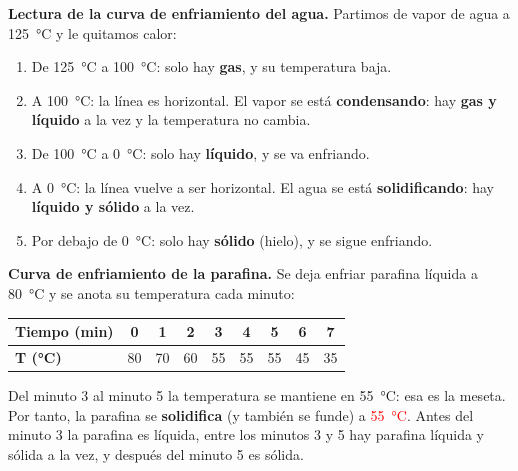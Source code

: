 \begin{example}
    \textbf{Lectura de la curva de enfriamiento del agua.} Partimos de vapor de agua a \qty{125}{\celsius} y le quitamos calor:
    \begin{enumerate}[label=\numberballmDarkTeal]
        \item De \qty{125}{\celsius} a \qty{100}{\celsius}: solo hay \textbf{gas}, y su temperatura baja.
        \item A \qty{100}{\celsius}: la línea es horizontal. El vapor se está \textbf{condensando}: hay \textbf{gas y líquido} a la vez y la temperatura no cambia.
        \item De \qty{100}{\celsius} a \qty{0}{\celsius}: solo hay \textbf{líquido}, y se va enfriando.
        \item A \qty{0}{\celsius}: la línea vuelve a ser horizontal. El agua se está \textbf{solidificando}: hay \textbf{líquido y sólido} a la vez.
        \item Por debajo de \qty{0}{\celsius}: solo hay \textbf{sólido} (hielo), y se sigue enfriando.
    \end{enumerate}
\end{example}

\begin{example}
    \textbf{Curva de enfriamiento de la parafina.} Se deja enfriar parafina líquida a \qty{80}{\celsius} y se anota su temperatura cada minuto:
    \begin{center}
        \renewcommand{\arraystretch}{1.3}
        \begin{tabular}{@{}lcccccccc@{}}
            \toprule
            \textbf{Tiempo (min)} & \textbf{0} & \textbf{1} & \textbf{2} & \textbf{3} & \textbf{4} & \textbf{5} & \textbf{6} & \textbf{7} \\
            \midrule
            \textbf{T (\unit{\celsius})} & 80 & 70 & 60 & 55 & 55 & 55 & 45 & 35 \\
            \bottomrule
        \end{tabular}
    \end{center}
    Del minuto 3 al minuto 5 la temperatura se mantiene en \qty{55}{\celsius}: esa es la meseta. Por tanto, la parafina se \textbf{solidifica} (y también se funde) a \textcolor{red}{\qty{55}{\celsius}}. Antes del minuto 3 la parafina es líquida, entre los minutos 3 y 5 hay parafina líquida y sólida a la vez, y después del minuto 5 es sólida.
\end{example}

